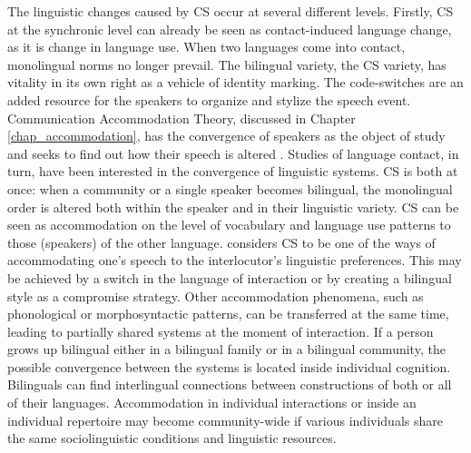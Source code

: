 \documentclass[output=paper]{langscibook}
\begin{document}
\begin{sloppypar}
The linguistic changes caused by CS occur at several different levels. Firstly, CS at the synchronic level can already be seen as contact-induced language change, as it is change in language use. When two languages come into contact, monolingual norms no longer prevail. The bilingual variety, the CS variety, has vitality in its own right as a vehicle of identity marking. The code-switches are an added resource for the speakers to organize and stylize the speech event. Communication Accommodation Theory, discussed in Chapter \ref{chap_accommodation}, has the convergence of speakers as the object of study and seeks to find out how their speech is altered \parencite{niedzielskietal1996linguistic}. Studies of language contact, in turn, have been interested in the convergence of linguistic systems. CS is both at once: when a community or a single speaker becomes bilingual, the monolingual order is altered both within the speaker and in their linguistic variety. CS can be seen as accommodation on the level of vocabulary and language use patterns to those (speakers) of the other language. \textcite[78]{gardner2009code} considers CS to be one of the ways of accommodating one's speech to the interlocutor’s linguistic preferences. This may be achieved by a switch in the language of interaction or by creating a bilingual style as a compromise strategy. Other accommodation phenomena, such as phonological or morphosyntactic patterns, can be transferred at the same time, leading to partially shared systems at the moment of interaction. If a person grows up bilingual either in a bilingual family or in a bilingual community, the possible convergence between the systems is located inside individual cognition. Bilinguals can find interlingual connections between constructions of both or all of their languages. Accommodation in individual interactions or inside an individual repertoire may become community-wide if various individuals share the same sociolinguistic conditions and linguistic resources. 
\end{sloppypar}
\end{document}

